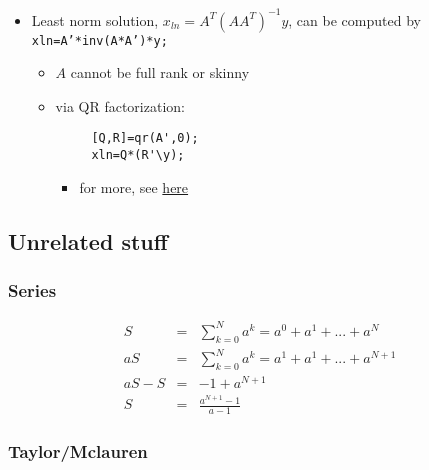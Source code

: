 \documentclass[10pt,letterpaper]{article}
\begin{document}
\begin{itemize}
\begin{itemize}
\item only works if $A$ is skinny or square
\item compute using QR (economy) factorization with
\begin{verbatim}
     [Q,R]=qr(A,0); % compute economy QR decomposition
     xls=R\(Q'*y);
\end{verbatim}

\end{itemize}

\item Least norm solution, $x _{ln} = A ^{T} (AA ^{T} ) ^{-1} y$, can be computed by \texttt{xln=A'*inv(A*A')*y;}

\begin{itemize}
\item $A$ cannot be full rank or skinny
\item via QR factorization:
\begin{verbatim}
     [Q,R]=qr(A',0);
     xln=Q*(R'\y);
\end{verbatim}


\begin{itemize}
\item for more, see \href{file:///Users/FingerMan/Dropbox/AK-MBP/edu/systems/IntroToLinearDynamicalSys/materials/lsoeldsee263/Additional5-sle_matlab.pdf}{here}
\end{itemize}

\end{itemize}

\end{itemize}
\subsection{Unrelated stuff}
\label{sec-20_4}
\subsubsection{Series}
\label{sec-20_4_1}

\begin{eqnarray}
 S &=&\sum ^{N} _{k=0} a ^{k} =a ^{0} + a ^{1} + ...+ a ^{N} \\
 aS &=&\sum ^{N} _{k=0} a ^{k} =a ^{1} + a ^{1} + ...+ a ^{N+1} \\
 aS-S &=& -1+a ^{N+1} \\
 S &=& \frac{a^{N+1}-1}{a-1}
\end{eqnarray}
\subsubsection{Taylor/Mclauren}
\label{sec-20_4_2}
\end{document}
